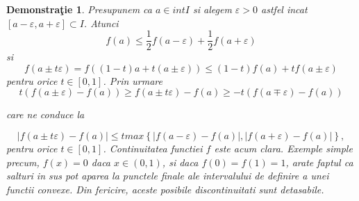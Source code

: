 \documentclass[a4paper,12pt,oneside]{report}
\newtheorem{demonstration}{Demonstra\c tie}
\begin{document}
\begin{demonstration}
	Presupunem ca \(a\in  int I\)
 si alegem \(\varepsilon > 0\)
 astfel incat \(\left [ a - \varepsilon , a + \varepsilon  \right ] \subset I\).
 Atunci  
\begin{displaymath}
  f\left ( a \right )\leq \frac{1}{2} f\left ( a - \varepsilon  \right ) + \frac{1}{2}f \left ( a + \varepsilon  \right )
\end{displaymath}
si 
\begin{displaymath}
  f\left ( a \pm t\varepsilon  \right )= f\left ( \left ( 1 - t \right ) a + t\left ( a \pm \varepsilon  \right )\right )\leq \left ( 1 - t \right )f\left ( a \right ) + tf\left ( a\pm \varepsilon  \right )
\end{displaymath}
pentru orice \(t\in \left [ 0 , 1 \right ]\). Prin urmare 
\begin{displaymath}
  t\left ( f\left ( a\pm \varepsilon  \right ) - f\left ( a \right ) \right )\geq f\left ( a\pm t\varepsilon  \right )- f\left ( a \right )\geq -t\left ( f\left ( a\mp \varepsilon  \right ) - f\left ( a \right )\right )
\end{displaymath}

care ne conduce la 

\begin{displaymath}
  \left | f\left ( a\pm t\varepsilon  \right )- f\left ( a \right ) \right |\leq t max \left \{ \left | f\left ( a-\varepsilon  \right )- f\left ( a \right ) \right |, \left | f\left ( a+\varepsilon  \right ) - f\left ( a \right )\right | \right \},
\end{displaymath}
 pentru orice \(t\in \left [ 0 , 1 \right ]\). Continuitatea functiei \(f\) este acum clara. 
	Exemple simple precum, \(f\left ( x \right )= 0\) daca \(x\in \left ( 0 , 1 \right )\), si daca \(f\left ( 0 \right )= f\left ( 1 \right ) = 1\), arate faptul ca salturi in sus pot aparea la punctele finale ale intervalului de definire a unei functii convexe. Din fericire, aceste posibile discontinuitati sunt detasabile. 

\end{demonstration}
\end{document}
